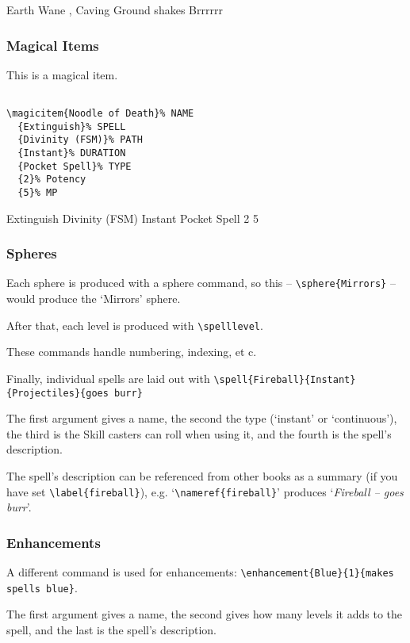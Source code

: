 \documentclass[a4paper,openany]{book}
\begin{document}
\begin{multicols}{2}
  {Earth}%
  {Wane}%
  {\distant, \duplicated}%
  {Caving}%
  {Ground shakes}%
  {Brrrrrr}%

\subsubsection{Magical Items}

This is a magical item.

\begin{verbatim}

\magicitem{Noodle of Death}% NAME
  {Extinguish}% SPELL
  {Divinity (FSM)}% PATH
  {Instant}% DURATION
  {Pocket Spell}% TYPE
  {2}% Potency
  {5}% MP

\end{verbatim}

  {Extinguish}%
  {Divinity (FSM)}%
  {Instant}%
  {Pocket Spell}%
  {2}%
  {5}%

\subsubsection{Spheres}

Each sphere is produced with a sphere command, so this -- \verb"\sphere{Mirrors}" -- would produce the `Mirrors' sphere.

After that, each level is produced with \verb"\spelllevel".

These commands handle numbering, indexing, et c.

Finally, individual spells are laid out with \verb"\spell{Fireball}{Instant}{Projectiles}{goes burr}"

The first argument gives a name, the second the type (`instant' or `continuous'), the third is the Skill casters can roll when using it, and the fourth is the spell's description.

The spell's description can be referenced from other books as a summary (if you have set \verb"\label{fireball}"), e.g. `\verb"\nameref{fireball}"' produces `\textit{Fireball -- goes burr}'.

\subsubsection{Enhancements}
A different command is used for enhancements: \verb"\enhancement{Blue}{1}{makes spells blue}".

The first argument gives a name, the second gives how many levels it adds to the spell, and the last is the spell's description.


\end{multicols}
\end{document}

